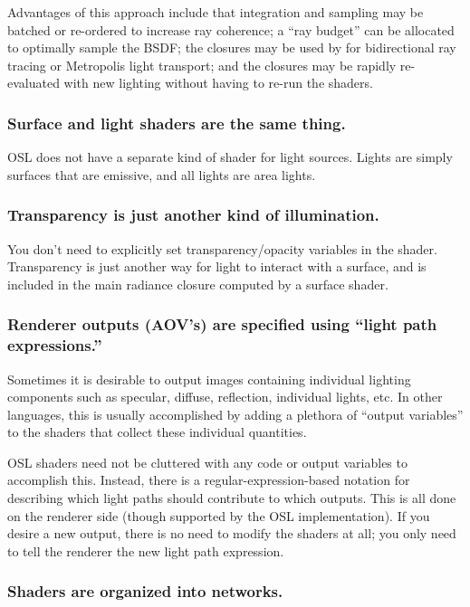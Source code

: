 \documentclass[11pt,letterpaper]{book}
\begin{document}
  Advantages of this approach include that integration and sampling may
  be batched or re-ordered to increase ray coherence; a ``ray budget'' can
  be allocated to optimally sample the BSDF; the closures may be used by
  for bidirectional ray tracing or Metropolis light transport; and the
  closures may be rapidly re-evaluated with new lighting without having
  to re-run the shaders.

\subsubsection*{Surface and light shaders are the same thing.}

  OSL does not have a separate kind of shader for light sources.  Lights
  are simply surfaces that are emissive, and all lights are area lights.

\subsubsection*{Transparency is just another kind of illumination.}

  You don't need to explicitly set transparency/opacity variables in the
  shader.  Transparency is just another way for light to interact with a
  surface, and is included in the main radiance closure computed by a
  surface shader.

\subsubsection*{Renderer outputs (AOV's) are specified using ``light path expressions.''}

  Sometimes it is desirable to output images containing individual
  lighting components such as specular, diffuse, reflection, individual
  lights, etc.  In other languages, this is usually accomplished by
  adding a plethora of ``output variables'' to the shaders that collect
  these individual quantities.

  OSL shaders need not be cluttered with any code or output variables to
  accomplish this.  Instead, there is a regular-expression-based
  notation for describing which light paths should contribute to which
  outputs.  This is all done on the renderer side (though supported by
  the OSL implementation).  If you desire a new output, there is no need
  to modify the shaders at all; you only need to tell the renderer the
  new light path expression.

\subsubsection*{Shaders are organized into networks.}
\end{document}
